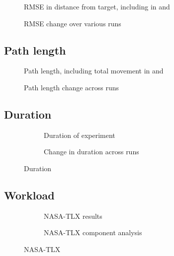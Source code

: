   \begin{figure}[h]
    \centering
    \ifdraft{}{}
    \label{fig:rms}
    \caption{RMSE in distance from target, including in  and }
  \end{figure}

  \begin{figure}[h]
    \centering
    \ifdraft{}{}
    \label{fig:rms_runs}
    \caption{RMSE change over various runs}
  \end{figure}

  \subsection{Path length}
  \begin{figure}[h]
    \centering
    \ifdraft{}{}
    \label{fig:movement}
    \caption{Path length, including total movement in  and }
  \end{figure}

  \begin{figure}[h]
    \centering
    \ifdraft{}{}
    \label{fig:movement_runs}
    \caption{Path length change across runs}
  \end{figure}

  \subsection{Duration}
  \begin{figure}[h]
    \centering
    \begin{subfigure}[b]{0.45\textwidth}
      \ifdraft{}{}
      \label{fig:duration_result}
      \caption{Duration of experiment}
    \end{subfigure}
    \hfill
    \begin{subfigure}[b]{0.45\textwidth}
      \ifdraft{}{}
      \label{fig:duration_runs}
      \caption{Change in duration across runs}
    \end{subfigure}
    \label{fig:duration}
    \caption{Duration}
  \end{figure}

  \subsection{Workload}
  \begin{figure}[h]
    \centering
    \begin{subfigure}[b]{0.45\textwidth}
      \ifdraft{}{}
      \label{fig:results}
      \caption{NASA-TLX results}
    \end{subfigure}
    \hfill
    \begin{subfigure}[b]{0.45\textwidth}
      \ifdraft{}{}
      \label{fig:tlx_components}
      \caption{NASA-TLX component analysis}
    \end{subfigure}
    \label{fig:tlx}
    \caption{NASA-TLX}
  \end{figure}

